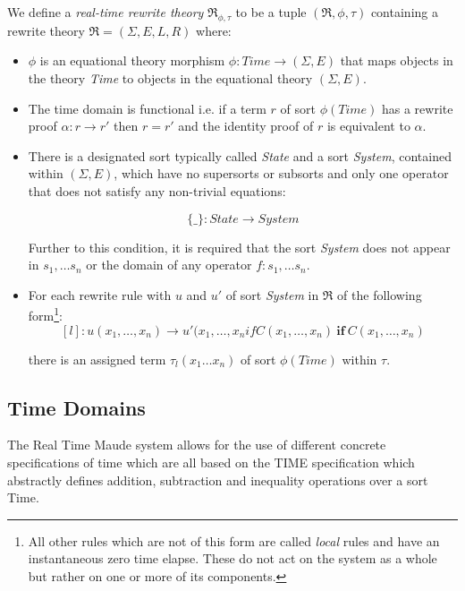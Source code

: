 \medskip
\begin{mydef}
We define a \emph{real-time rewrite theory} $\mathfrak{R}_{\phi,\tau}$ to be a tuple $(\mathfrak{R}, \phi,\tau)$ containing a rewrite theory $\mathfrak{R} = (\Sigma, E,L,R) $ where:

\begin{itemize}
\item $\phi$ is an equational theory morphism $\phi : \mathit{Time} \to (\Sigma, E)$ that maps objects in the theory \textit{Time} to objects in the equational theory $(\Sigma , E)$.

\item The time domain is functional i.e. if a term $r$ of sort $\phi(Time)$  has a rewrite proof $\alpha: r \to r'$ then $r = r'$ and the identity proof of $r$ is equivalent to $\alpha$.

\item There is a designated sort typically called \textit{State} and a sort \textit{System}, contained within $(\Sigma, E)$, which have no supersorts or subsorts and only one operator that does not satisfy any non-trivial equations:

$$\{\_\}: State \to System$$

Further to this condition, it is required that the sort \textit{System} does not appear in $s_1, \ldots s_n$  or the domain  of  any operator $f: s_1, \ldots s_n$.

\item For each rewrite rule with $u$ and $u'$ of sort \textit{System} in $\mathfrak{R}$ of the following form\footnote{All other rules which are not of this form are called \emph{local} rules and have an instantaneous zero time elapse. These do not act on the system as a whole but rather on one or more of its components.}:
$$[l]: u(x_1,\ldots ,x_n) \to u'(x_1,\ldots ,x_n if C(x_1, \ldots ,x_n) \ \textbf{if} \ C(x_1, \ldots ,x_n)$$


there is an assigned term $\tau_l(x_1 \ldots x_n)$ of sort $\phi(Time)$ within $\tau$.

\end{itemize}
\end{mydef}

\subsection*{Time Domains}
The Real Time Maude system allows for the use of different concrete specifications of time which are all based on the TIME specification which abstractly defines addition, subtraction and inequality operations over a sort Time. 


